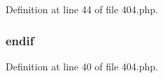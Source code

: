 Definition at line 44 of file 404.\+php.

\hypertarget{404_8php_a82cd33ca97ff99f2fcc5e9c81d65251b}{}
\subsubsection[{endif}]{\setlength{\rightskip}{0pt plus 5cm}endif}\label{404_8php_a82cd33ca97ff99f2fcc5e9c81d65251b}


Definition at line 40 of file 404.\+php.

